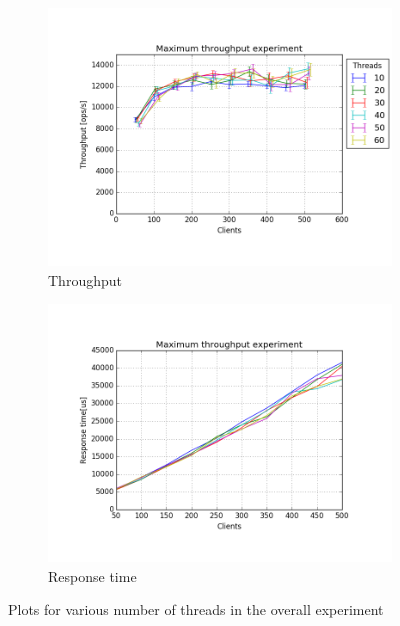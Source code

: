 \documentclass[11pt]{article}
\begin{document}
\begin{figure}
\centering
\begin{subfigure}{.5\textwidth}
	\centering
	\includegraphics[width=\linewidth]{plots/max_throughput_all_overall}
	\caption{Throughput}
\end{subfigure}%
\begin{subfigure}{.5\textwidth}
	\centering
	\includegraphics[width=\linewidth]{plots/max_throughput-response_time_all_overall}
	\caption{Response time}
\end{subfigure}
\caption{Plots for various number of threads in the overall experiment}
\label{fig:max-throughput-overall}
\end{figure}
\end{document}
